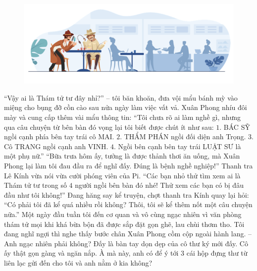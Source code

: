 	\begin{figure}[H]
			\centering
			\vspace*{-5pt}
			\captionsetup{labelformat= empty, justification=centering}
			\includegraphics[width=1\linewidth]{4}
			\vspace*{-15pt}
		\end{figure}
	“Vậy ai là Thám tử tư đây nhỉ?” -- tôi băn khoăn, đưa vội mẩu bánh mỳ vào miệng cho bụng đỡ cồn cào sau nửa ngày làm việc vất vả. 
	\vskip 0.1cm
	Xuân Phong nhíu đôi mày và cung cấp thêm vài mẩu thông tin: “Tôi chưa rõ ai làm nghề gì, nhưng qua câu chuyện từ bên bàn đó vọng lại tôi biết được chút ít như sau: 
	\vskip 0.1cm
	$1.$ BÁC SỸ ngồi cạnh phía bên tay trái cô MAI. 
	\vskip 0.1cm
	$2.$ THẨM PHÁN ngồi đối diện anh Trọng.
	\vskip 0.1cm
	$3.$ Cô TRANG ngồi cạnh anh VINH. 
	\vskip 0.1cm
	$4.$ Ngồi bên cạnh bên tay trái LUẬT SƯ là một phụ nữ.” 
	\vskip 0.1cm
	“Bữa trưa hôm ấy, tưởng là được thảnh thơi ăn uống, mà Xuân Phong lại làm tôi đau đầu ra để nghĩ đấy. Đúng là bệnh nghề nghiệp!” Thanh tra Lê Kính vừa nói vừa cười phóng viên của Pi. “Các bạn nhỏ thử tìm xem ai là Thám tử tư trong số $4$ người ngồi bên bàn đó nhé! Thử xem các bạn có bị đâu đầu như tôi không!”
	\vskip 0.1cm
	Đang hăng say kể truyện, chợt thanh tra Kính quay lại hỏi: “Có phải tôi đã kể quá nhiều rồi không? Thôi, tôi sẽ kể thêm nốt một câu chuyện nữa.”
	\vskip 0.1cm
	\textbf{\color{toancuabi}{Ba chiếc hộp và cô thư ký}}
	\vskip 0.1cm
	Một ngày đầu tuần tôi đến cơ quan và vô cùng ngạc nhiên vì văn phòng thám tử mọi khi khá bừa bộn đã được sắp đặt gọn ghẽ, lau chùi thơm tho. Tôi đang nghĩ ngợi thì nghe thấy bước chân Xuân Phong cồm cộp ngoài hành lang. 
	\vskip 0.1cm
	-- Anh ngạc nhiên phải không? Đấy là bàn tay dọn dẹp của cô thư ký mới đấy. Cô ấy thật gọn gàng và ngăn nắp. À mà này, anh có để ý tới $3$ cái hộp đựng thư từ liên lạc gửi đến cho tôi và anh nằm ở kia không? 

